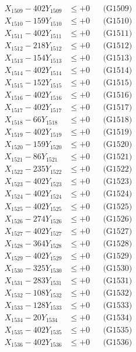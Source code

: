 \documentclass[a4paper,10pt]{article}
\begin{document}
{\begin{align}
X_{1509} - 402Y_{1509} &\leq +0 && \text{(G1509)} \\
X_{1510} - 159Y_{1510} &\leq +0 && \text{(G1510)} \\
\allowbreak
X_{1511} - 402Y_{1511} &\leq +0 && \text{(G1511)} \\
X_{1512} - 218Y_{1512} &\leq +0 && \text{(G1512)} \\
X_{1513} - 154Y_{1513} &\leq +0 && \text{(G1513)} \\
X_{1514} - 402Y_{1514} &\leq +0 && \text{(G1514)} \\
X_{1515} - 152Y_{1515} &\leq +0 && \text{(G1515)} \\
X_{1516} - 402Y_{1516} &\leq +0 && \text{(G1516)} \\
X_{1517} - 402Y_{1517} &\leq +0 && \text{(G1517)} \\
X_{1518} - 66Y_{1518} &\leq +0 && \text{(G1518)} \\
X_{1519} - 402Y_{1519} &\leq +0 && \text{(G1519)} \\
X_{1520} - 159Y_{1520} &\leq +0 && \text{(G1520)} \\
\allowbreak
X_{1521} - 86Y_{1521} &\leq +0 && \text{(G1521)} \\
X_{1522} - 235Y_{1522} &\leq +0 && \text{(G1522)} \\
X_{1523} - 402Y_{1523} &\leq +0 && \text{(G1523)} \\
X_{1524} - 402Y_{1524} &\leq +0 && \text{(G1524)} \\
X_{1525} - 402Y_{1525} &\leq +0 && \text{(G1525)} \\
X_{1526} - 274Y_{1526} &\leq +0 && \text{(G1526)} \\
X_{1527} - 402Y_{1527} &\leq +0 && \text{(G1527)} \\
X_{1528} - 364Y_{1528} &\leq +0 && \text{(G1528)} \\
X_{1529} - 402Y_{1529} &\leq +0 && \text{(G1529)} \\
X_{1530} - 325Y_{1530} &\leq +0 && \text{(G1530)} \\
\allowbreak
X_{1531} - 283Y_{1531} &\leq +0 && \text{(G1531)} \\
X_{1532} - 108Y_{1532} &\leq +0 && \text{(G1532)} \\
X_{1533} - 128Y_{1533} &\leq +0 && \text{(G1533)} \\
X_{1534} - 20Y_{1534} &\leq +0 && \text{(G1534)} \\
X_{1535} - 402Y_{1535} &\leq +0 && \text{(G1535)} \\
X_{1536} - 402Y_{1536} &\leq +0 && \text{(G1536)} \\

\end{align}}
\end{document}
